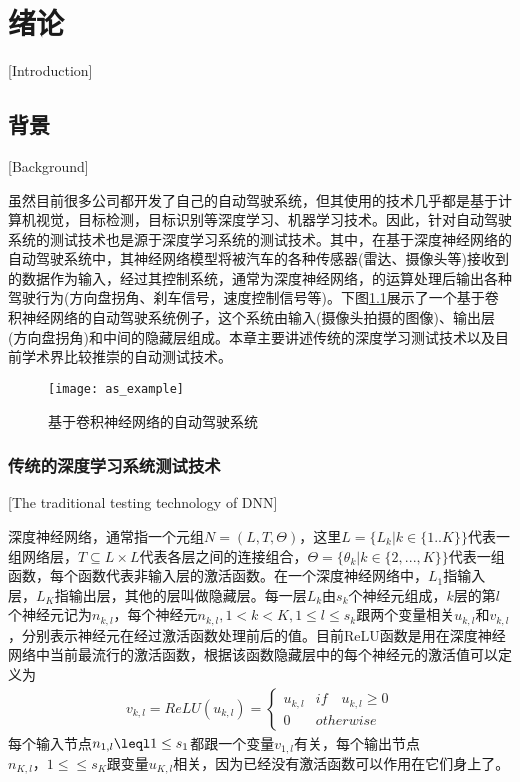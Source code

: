 \newcommand{\specialcell}[2][c]{%
  \begin{tabular}[#1]{@{}c@{}}#2\end{tabular}}
\newcommand{\mthead}[1]{\textit{\textbf{#1}}}

\newcommand{\newmodel}[1]{\textbf{#1.}\cite{#1}\quad}

\chapter{绪论}[Introduction]

\section{背景}[Background]

虽然目前很多公司都开发了自己的自动驾驶系统，但其使用的技术几乎都是基于计算机视觉，目标检测，目标识别等深度学习、机器学习技术。因此，针对自动驾驶系统的测试技术也是源于深度学习系统的测试技术。其中，在基于深度神经网络的自动驾驶系统中，其神经网络模型将被汽车的各种传感器(雷达、摄像头等)接收到的数据作为输入，经过其控制系统，通常为深度神经网络，的运算处理后输出各种驾驶行为(方向盘拐角、刹车信号，速度控制信号等)。下图\ref{as_example}展示了一个基于卷积神经网络的自动驾驶系统例子，这个系统由输入(摄像头拍摄的图像)、输出层(方向盘拐角)和中间的隐藏层组成。本章主要讲述传统的深度学习测试技术以及目前学术界比较推崇的自动测试技术。

\begin{figure}[h]
    \centering
    \texttt{[image: as\_example]}
    \caption{基于卷积神经网络的自动驾驶系统\cite{DeepRoad}}
    \label{as_example}
\end{figure}

\subsection{传统的深度学习系统测试技术}[The traditional testing technology of DNN]

深度神经网络，通常指一个元组$N=(L,T,\Theta)$，这里$L=\{L_k|k\in \{1..K\}\}$代表一组网络层，$T\subseteq L\times L$代表各层之间的连接组合，$\Theta=\{\theta_k|k\in \{2,...,K\}\}$代表一组函数，每个函数代表非输入层的激活函数。在一个深度神经网络中，$L_1$指输入层，$L_K$指输出层，其他的层叫做隐藏层。每一层$L_k$由$s_k$个神经元组成，$k$层的第$l$个神经元记为$n_{k,l}$，每个神经元$n_{k,l},1\lt k \lt K, 1\leq l\leq s_k$跟两个变量相关$u_{k,l}$和$v_{k,l}$，分别表示神经元在经过激活函数处理前后的值。目前ReLU\cite{relu}函数是用在深度神经网络中当前最流行的激活函数，根据该函数隐藏层中的每个神经元的激活值可以定义为
\begin{gather}
    v_{k,l}=ReLU(u_{k,l})=\begin{cases}
        u_{k,l} & if\quad u_{k,l} \geq 0 \\
        0 & otherwise
    \end{cases}
\end{gather}
每个输入节点$n_{1,l}\leql 1 \leq s_1$都跟一个变量$v_{1,l}$有关，每个输出节点$n_{K,l}，1\leq \leq s_K$跟变量$u_{K,l}$相关，因为已经没有激活函数可以作用在它们身上了。 

